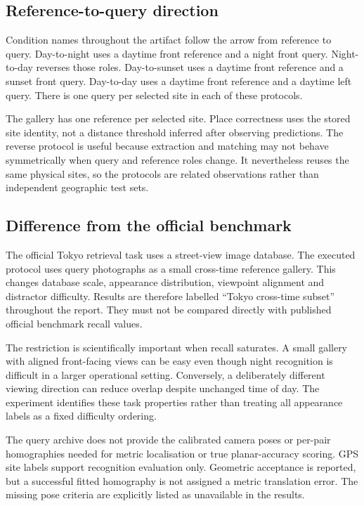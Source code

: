 \subsection{Reference-to-query direction}
Condition names throughout the artifact follow the arrow from reference to query. Day-to-night uses a daytime front reference and a night front query. Night-to-day reverses those roles. Day-to-sunset uses a daytime front reference and a sunset front query. Day-to-day uses a daytime front reference and a daytime left query. There is one query per selected site in each of these protocols.

The gallery has one reference per selected site. Place correctness uses the stored site identity, not a distance threshold inferred after observing predictions. The reverse protocol is useful because extraction and matching may not behave symmetrically when query and reference roles change. It nevertheless reuses the same physical sites, so the protocols are related observations rather than independent geographic test sets.

\subsection{Difference from the official benchmark}
The official Tokyo retrieval task uses a street-view image database. The executed protocol uses query photographs as a small cross-time reference gallery. This changes database scale, appearance distribution, viewpoint alignment and distractor difficulty. Results are therefore labelled ``Tokyo cross-time subset'' throughout the report. They must not be compared directly with published official benchmark recall values.

The restriction is scientifically important when recall saturates. A small gallery with aligned front-facing views can be easy even though night recognition is difficult in a larger operational setting. Conversely, a deliberately different viewing direction can reduce overlap despite unchanged time of day. The experiment identifies these task properties rather than treating all appearance labels as a fixed difficulty ordering.

The query archive does not provide the calibrated camera poses or per-pair homographies needed for metric localisation or true planar-accuracy scoring. GPS site labels support recognition evaluation only. Geometric acceptance is reported, but a successful fitted homography is not assigned a metric translation error. The missing pose criteria are explicitly listed as unavailable in the results.

